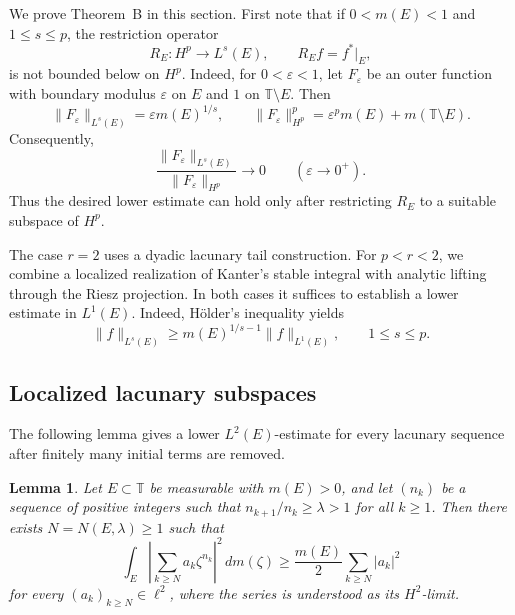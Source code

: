 \documentclass[11pt, reqno]{amsart}
\newtheorem{lemma}[theorem]{Lemma}
\theoremstyle{definition}
\theoremstyle{remark}
\newcommand{\T}{\mathbb{T}}
\begin{document}
 
We prove Theorem~B in this section. First note that if
\(0<m(E)<1\) and \(1\le s\le p\), the restriction operator
\[
        R_E:H^p\longrightarrow L^s(E),
        \qquad
        R_Ef=f^*|_E,
\]
is not bounded below on \(H^p\). Indeed, for
\(0<\varepsilon<1\), let \(F_\varepsilon\) be an outer function with
boundary modulus \(\varepsilon\) on \(E\) and \(1\) on
\(\T\setminus E\).
Then
\[
        \|F_\varepsilon\|_{L^s(E)}
        =
        \varepsilon m(E)^{1/s},
        \qquad
        \|F_\varepsilon\|_{H^p}^p
        =
        \varepsilon^p m(E)+m(\T\setminus E).
\]
Consequently,
\[
        \frac{\|F_\varepsilon\|_{L^s(E)}}
             {\|F_\varepsilon\|_{H^p}}
        \longrightarrow0
        \qquad
        (\varepsilon\to0^+).
\]
Thus the desired lower estimate can hold only after restricting
\(R_E\) to a suitable subspace of \(H^p\).
  


The case \(r=2\) uses a dyadic lacunary tail construction. For \(p<r<2\), we combine
a localized realization of Kanter's stable integral with analytic
lifting through the Riesz projection. In both cases it suffices to
establish a lower estimate in \(L^1(E)\).  Indeed,   H\"older's inequality yields
\[
\|f\|_{L^s(E)}
\ge
m(E)^{1/s-1}\|f\|_{L^1(E)},\qquad
1\le s\le p.
\] 





\subsection{Localized lacunary subspaces}
\label{subsec:lacunary}

The following lemma gives a lower \(L^2(E)\)-estimate for every
lacunary sequence after finitely many initial terms are removed.

\begin{lemma}
\label{lem:lacunary-set}
Let \(E\subset\T\) be measurable with \(m(E)>0\), and let \((n_k)\) be
a sequence of positive integers such that
\(n_{k+1}/n_k\ge\lambda>1\) for all \(k\ge1\). Then there exists
\(N=N(E,\lambda)\ge1\) such that
\begin{equation}
\label{eq:lacunary-set}
        \int_E
        \left|
        \sum_{k\ge N}a_k\zeta^{n_k}
        \right|^2\,dm(\zeta)
        \ge
        \frac{m(E)}{2}
        \sum_{k\ge N}|a_k|^2
\end{equation}
for every \((a_k)_{k\ge N}\in\ell^2\), where the series is understood
as its \(H^2\)-limit.
\end{lemma}
\end{document}
